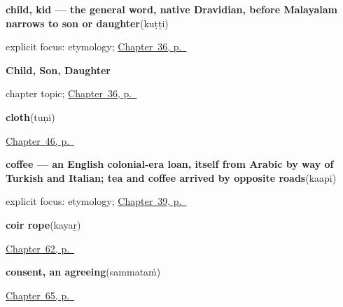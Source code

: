 \noindent\begin{minipage}[t]{\linewidth}
\raggedright
\textbf{child, kid — the general word, native Dravidian, before Malayalam narrows to son or daughter}\enspace\emph{}\enspace(kuṭṭi)\par
\footnotesize explicit focus: etymology; \hyperref[ch:ml-child-son-daughter]{Chapter~36, p.~\pageref*{ch:ml-child-son-daughter}}
\end{minipage}\par\smallskip

\noindent\begin{minipage}[t]{\linewidth}
\raggedright
\textbf{Child, Son, Daughter}\par
\footnotesize chapter topic; \hyperref[ch:ml-child-son-daughter]{Chapter~36, p.~\pageref*{ch:ml-child-son-daughter}}
\end{minipage}\par\smallskip

\noindent\begin{minipage}[t]{\linewidth}
\raggedright
\textbf{cloth}\enspace\emph{}\enspace(tuṇi)\par
\footnotesize \hyperref[ch:ml-ask-for]{Chapter~46, p.~\pageref*{ch:ml-ask-for}}
\end{minipage}\par\smallskip

\noindent\begin{minipage}[t]{\linewidth}
\raggedright
\textbf{coffee — an English colonial-era loan, itself from Arabic by way of Turkish and Italian; tea and coffee arrived by opposite roads}\enspace\emph{}\enspace(kaapi)\par
\footnotesize explicit focus: etymology; \hyperref[ch:ml-tea-coffee-milk]{Chapter~39, p.~\pageref*{ch:ml-tea-coffee-milk}}
\end{minipage}\par\smallskip

\noindent\begin{minipage}[t]{\linewidth}
\raggedright
\textbf{coir rope}\enspace\emph{}\enspace(kayaṟ)\par
\footnotesize \hyperref[ch:ml-made-by-hand]{Chapter~62, p.~\pageref*{ch:ml-made-by-hand}}
\end{minipage}\par\smallskip

\noindent\begin{minipage}[t]{\linewidth}
\raggedright
\textbf{consent, an agreeing}\enspace\emph{}\enspace(sammataṁ)\par
\footnotesize \hyperref[ch:ml-asking-well]{Chapter~65, p.~\pageref*{ch:ml-asking-well}}
\end{minipage}\par\smallskip

